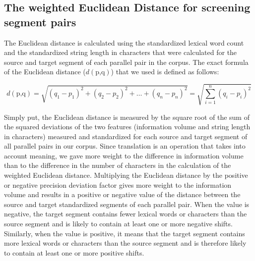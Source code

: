 \documentclass[output=paper]{langsci/langscibook}
\begin{document}
\subsection{The weighted Euclidean Distance for screening segment pairs}\label{ep:eup}

The Euclidean distance is calculated using the standardized lexical word count and the standardized string length in characters that were calculated for the source and target segment of each parallel pair in the corpus. The exact formula of the Euclidean distance ($d(\text{p,q})$) that we used is defined as follows:

\[
  d(\text{p,q})=\sqrt{(q_{1}-p_{1})^2+(q_{2}-p_{2})^2+\dots+(q_{n}-p_{n})^2}=\sqrt{\sum_{i=1}^n(q_{i} - p_{i})^2}
\]

Simply put, the Euclidean distance is measured by the square root of the sum of the squared deviations of the two features (information volume and string length in characters) measured and standardized for each source and target segment of all parallel pairs in our corpus. Since translation is an operation that takes into account meaning, we gave more weight to the difference in information volume than to the difference in the number of characters in the calculation of the weighted Euclidean distance. Multiplying the Euclidean distance by the positive or negative precision deviation factor gives more weight to the information volume and results in a positive or negative value of the distance between the source and target standardized segments of each parallel pair. When the value is negative, the target segment contains fewer lexical words or characters than the source segment and is likely to contain at least one or more negative shifts. Similarly, when the value is positive, it means that the target segment contains more lexical words or characters than the source segment and is therefore likely to contain at least one or more positive shifts.
\end{document}
